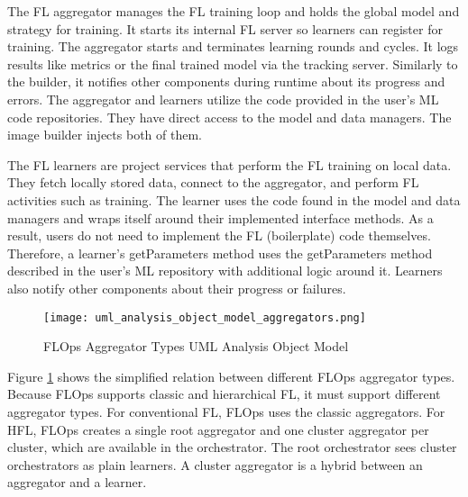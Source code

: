 The FL aggregator manages the FL training loop and holds the global model and strategy for training.
It starts its internal FL server so learners can register for training.
The aggregator starts and terminates learning rounds and cycles.
It logs results like metrics or the final trained model via the tracking server.
Similarly to the builder, it notifies other components during runtime about its progress and errors.
The aggregator and learners utilize the code provided in the user's ML code repositories.
They have direct access to the model and data managers.
The image builder injects both of them.

The FL learners are project services that perform the FL training on local data.
They fetch locally stored data, connect to the aggregator, and perform FL activities such as training.
The learner uses the code found in the model and data managers and wraps itself around their implemented interface methods.
As a result, users do not need to implement the FL (boilerplate) code themselves.
Therefore, a learner's getParameters method uses the getParameters method described in the user's ML repository with additional logic around it.
Learners also notify other components about their progress or failures.

\begin{figure}[h]
    \centering
    \texttt{[image: uml\_analysis\_object\_model\_aggregators.png]}
    \caption{FLOps Aggregator Types UML Analysis Object Model}
    \label{fig:uml_project_aggregators_analysis_object_model}
\end{figure}

Figure \ref{fig:uml_project_aggregators_analysis_object_model} shows the simplified relation between different FLOps aggregator types.
Because FLOps supports classic and hierarchical FL, it must support different aggregator types.
For conventional FL, FLOps uses the classic aggregators.
For HFL, FLOps creates a single root aggregator and one cluster aggregator per cluster, which are available in the orchestrator.
The root orchestrator sees cluster orchestrators as plain learners.
A cluster aggregator is a hybrid between an aggregator and a learner.
